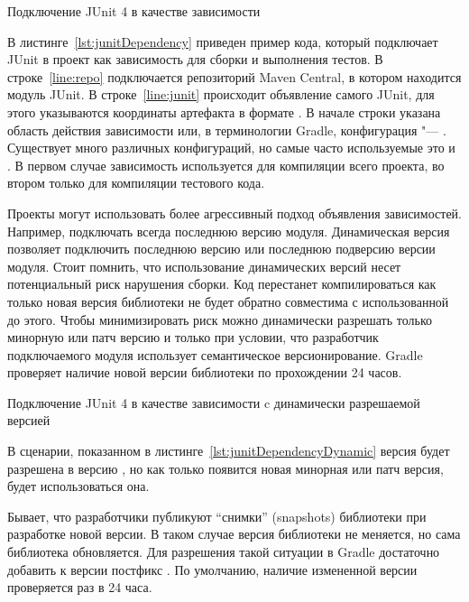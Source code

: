\begin{listing}[H]
  \caption{Подключение JUnit 4 в качестве зависимости}
  \label{lst:junitDependency}
\end{listing}

В листинге~\ref{lst:junitDependency} приведен пример кода, который подключает JUnit в проект как зависимость для сборки и выполнения тестов.
В строке~\ref{line:repo} подключается репозиторий Maven Central, в котором находится модуль JUnit.
В строке~\ref{line:junit} происходит объявление самого JUnit, для этого указываются координаты артефакта в формате .
В начале строки указана область действия зависимости или, в терминологии Gradle, конфигурация "--- .
Существует много различных конфигураций, но самые часто используемые это  и .
В первом случае зависимость используется для компиляции всего проекта, во втором только для компиляции тестового кода.

Проекты могут использовать более агрессивный подход объявления зависимостей.
Например, подключать всегда последнюю версию модуля.
Динамическая версия позволяет подключить последнюю версию или последнюю подверсию версии модуля.
Стоит помнить, что использование динамических версий несет потенциальный риск нарушения сборки.
Код перестанет компилироваться как только новая версия библиотеки не будет обратно совместима с использованной до этого.
Чтобы минимизировать риск можно динамически разрешать только минорную или патч версию и только при условии, что разработчик подключаемого модуля использует семантическое версионирование.
Gradle проверяет наличие новой версии библиотеки по прохождении 24 часов.

\begin{listing}[H]
  \caption{Подключение JUnit 4 в качестве зависимости c динамически разрешаемой версией}
  \label{lst:junitDependencyDynamic}
\end{listing}

В сценарии, показанном в листинге~\ref{lst:junitDependencyDynamic} версия  будет разрешена в версию , но как только появится новая минорная или патч версия, будет использоваться она.

Бывает, что разработчики публикуют ``снимки'' (snapshots) библиотеки при разработке новой версии.
В таком случае версия библиотеки не меняется, но сама библиотека обновляется.
Для разрешения такой ситуации в Gradle достаточно добавить к версии постфикс .
По умолчанию, наличие измененной версии проверяется раз в 24 часа.

